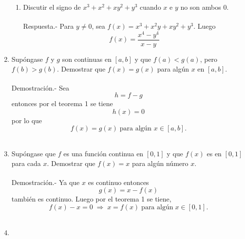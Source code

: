 \begin{enumerate}
\begin{enumerate}[\bfseries (a)]
	\item Discutir el signo de $x^3+x^2+xy^2+y^3$ cuando $x$ e $y$ no son ambos $0$.\\\\
	    Respuesta.-\; Para $y\neq 0$, sea $f(x)=x^3+x^2y+xy^2+y^3$. Luego
	    $$f(x)=\dfrac{x^4-y^4}{x-y}$$

    \end{enumerate}

\item Supóngase $f$ y $g$ son continuas en $[a,b]$ y que $f(a)<g(a)$, pero $f(b)>g(b)$. Demostrar que $f(x)=g(x)$ para algún $x$ en $[a,b]$.\\\\
    Demostración.-\; Sea $$h=f-g$$
    entonces por el teorema 1 se tiene $$h(x)=0$$
    por lo que $$f(x)=g(x)\; \mbox{para algún }x \in [a,b].$$\\

\item Supóngase que $f$ es una función continua en $[0,1]$ y que $f(x)$ es en $[0,1]$ para cada $x$. Demostrar que $f(x)=x$ para algún número $x$.\\\\
    Demostración.-\; Ya que $x$ es continuo entonces $$g(x)=x-f(x)$$ también es continuo. Luego por el teorema 1 se tiene,
    $$f(x) - x = 0 \; \Longrightarrow \; x=f(x) \; \mbox{para algún}\; x \in [0,1].$$\\

\item 

    

\end{enumerate}

